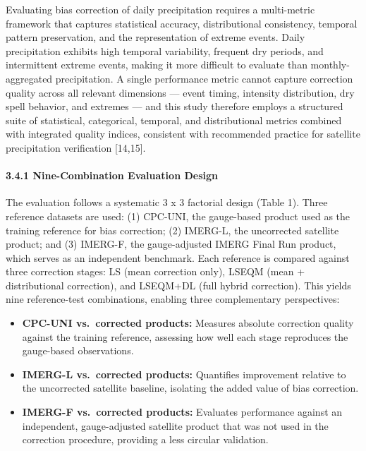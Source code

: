 \documentclass[
]{article}
\providecommand{\tightlist}{%
  \setlength{\itemsep}{0pt}\setlength{\parskip}{0pt}}
\begin{document}
Evaluating bias correction of daily precipitation requires a
multi-metric framework that captures statistical accuracy,
distributional consistency, temporal pattern preservation, and the
representation of extreme events. Daily precipitation exhibits high
temporal variability, frequent dry periods, and intermittent extreme
events, making it more difficult to evaluate than monthly-aggregated
precipitation. A single performance metric cannot capture correction
quality across all relevant dimensions --- event timing, intensity
distribution, dry spell behavior, and extremes --- and this study
therefore employs a structured suite of statistical, categorical,
temporal, and distributional metrics combined with integrated quality
indices, consistent with recommended practice for satellite
precipitation verification {[}14,15{]}.

\paragraph{3.4.1 Nine-Combination Evaluation
Design}\label{nine-combination-evaluation-design}

The evaluation follows a systematic 3 x 3 factorial design (Table 1).
Three reference datasets are used: (1) CPC-UNI, the gauge-based product
used as the training reference for bias correction; (2) IMERG-L, the
uncorrected satellite product; and (3) IMERG-F, the gauge-adjusted IMERG
Final Run product, which serves as an independent benchmark. Each
reference is compared against three correction stages: LS (mean
correction only), LSEQM (mean + distributional correction), and LSEQM+DL
(full hybrid correction). This yields nine reference-test combinations,
enabling three complementary perspectives:

\begin{itemize}
\tightlist
\item
  \textbf{CPC-UNI vs.~corrected products:} Measures absolute correction
  quality against the training reference, assessing how well each stage
  reproduces the gauge-based observations.
\item
  \textbf{IMERG-L vs.~corrected products:} Quantifies improvement
  relative to the uncorrected satellite baseline, isolating the added
  value of bias correction.
\item
  \textbf{IMERG-F vs.~corrected products:} Evaluates performance against
  an independent, gauge-adjusted satellite product that was not used in
  the correction procedure, providing a less circular validation.
\end{itemize}
\end{document}
